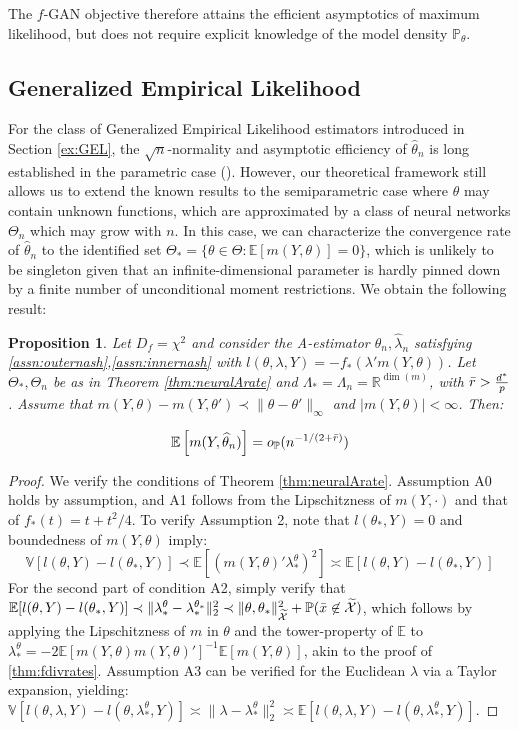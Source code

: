 \documentclass[12pt]{article}
\theoremstyle{myplain}
\newtheorem{proposition}{Proposition}[section]
\theoremstyle{definition}
\theoremstyle{definition}
\theoremstyle{remark}
\numberwithin{equation}{section}
\begin{document}
The $f$-GAN objective therefore attains the efficient asymptotics of maximum likelihood, but does not require explicit knowledge of the model density $\mathbb{P}_\theta$.

\subsection{Generalized Empirical Likelihood} \label{app:GEL}
For the class of Generalized Empirical Likelihood estimators introduced in Section \ref{ex:GEL}, the $\sqrt{n}$-normality and asymptotic efficiency of $\widehat{\theta}_n$ is long established in the parametric case (\cite{imbens1995gel, imbens2002GLE, newey2004generalized}). However, our theoretical framework still allows us to extend the known results to the semiparametric case where $\theta$ may contain unknown functions, which are approximated by a class of neural networks $\Theta_n$ which may grow with $n$. In this case, we can characterize the convergence rate of $\widehat{\theta}_n$ to the identified set  $\Theta_*=\{\theta\in\Theta:\mathbb{E}[m(Y, \theta)]=0\}$, which is unlikely to be singleton given that an infinite-dimensional parameter is hardly pinned down by a finite number of unconditional moment restrictions. We obtain the following result:
\begin{proposition}\label{thm:gelrates}
Let $D_f=\chi^2$ and consider the A-estimator $\widehat{\theta}_n, \widehat{\lambda}_n$ satisfying \ref{assn:outernash},\ref{assn:innernash} with $l(\theta, \lambda , Y)=-f_*(\lambda'm(Y, \theta))$. Let $\Theta_*, \Theta_n$ be as in Theorem \ref{thm:neuralArate} and $\Lambda_*=\Lambda_n=\mathbb{R}^{\operatorname{dim}(m)}$, with $\Bar{r}>\frac{d^*}{p}$. Assume that $m(Y,\theta)-m(Y,\theta')\prec \|\theta-\theta'\|_\infty$ and $|m(Y,\theta)|<\infty$. Then:

$$\mathbb{E}\left[m(Y, \widehat{\theta}_n)\right] = o_\mathbb{P}(n^{-1/(2+\Bar{r})})$$
\end{proposition}
\begin{proof}
We verify the conditions of Theorem \ref{thm:neuralArate}. Assumption A0 holds by assumption, and A1 follows from the Lipschitzness of $m(Y, \cdot)$ and that of $f_*(t)=t+t^2/4$. To verify Assumption 2, note that $l(\theta_*, Y)=0$ and boundedness of $m(Y,\theta)$ imply: 
$$\mathbb{V}[l(\theta,Y)-l(\theta_*, Y)] \prec \mathbb{E}[(m(Y, \theta)'\lambda_*^\theta)^2] \asymp \mathbb{E}[l(\theta, Y)-l(\theta_*, Y)]$$
For the second part of condition A2, simply verify that $\mathbb{E}[l(\theta, Y)-l(\theta_*, Y)]\prec  \|\lambda_*^\theta-\lambda_*^{\theta_*}\|^2_2 \prec \|\theta, \theta_*\|_{\widetilde{\mathcal{X}}}^2 +\mathbb{P}(\Bar{x}\not\in\widetilde{\mathcal{X}})$, which follows by applying the Lipschitzness of $m$ in $\theta$ and the tower-property of $\mathbb{E}$ to $\lambda_*^\theta=-2\mathbb{E}[m(Y,\theta)m(Y, \theta)']^{-1}\mathbb{E}[m(Y,\theta)]$, akin to the proof of \ref{thm:fdivrates}. Assumption A3 can be verified for the Euclidean $\lambda$ via a Taylor expansion, yielding: $\mathbb{V}[l(\theta, \lambda, Y)-l(\theta, \lambda_*^\theta, Y)]\asymp \|\lambda-\lambda_*^\theta\|_2^2\asymp\mathbb{E}[l(\theta, \lambda, Y)-l(\theta, \lambda_*^\theta, Y)]$.
\end{proof}
\end{document}
